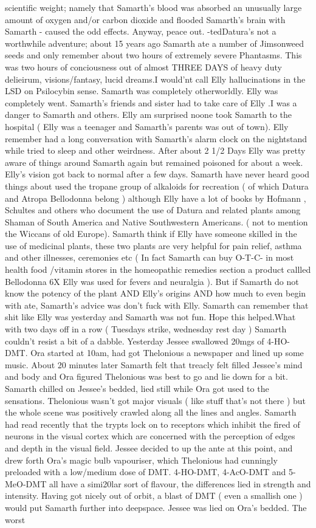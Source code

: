 \documentclass[12pt]{book}
\begin{document}
scientific weight; namely that Samarth's blood was absorbed an unusually large amount of oxygen and/or carbon dioxide and flooded Samarth's brain with Samarth - caused the odd effects. Anyway, peace out. -tedDatura's not a worthwhile adventure; about 15 years ago Samarth ate a number of Jimsonweed seeds and only remember about two hours of extremely severe Phantasms. This was two hours of conciousness out of almost THREE DAYS of heavy duty delieirum, visions/fantasy, lucid dreams.I would'nt call Elly hallucinations in the LSD on Psilocybin sense. Samarth was completely otherworldly. Elly was completely went. Samarth's friends and sister had to take care of Elly .I was a danger to Samarth and others. Elly am surprised noone took Samarth to the hospital (  Elly was a teenager and Samarth's parents was out of town). Elly remember had a long conversation with Samarth's alarm clock on the nightstand while tried to sleep and other weirdness. After about 2 1/2 Days Elly was pretty aware of things around Samarth again but remained poisoned for about a week. Elly's vision got back to normal after a few days. Samarth have never heard good things about used the tropane group of alkaloids for recreation ( of which Datura and Atropa Bellodonna belong ) although Elly have a lot of books by Hofmann , Schultes and others who document the use of Datura and related plants among Shaman of South America and Native Southwestern Americans. ( not to mention the Wiccans of old Europe). Samarth think if Elly have someone skilled in the use of medicinal plants, these two plants are very helpful for pain relief, asthma and other illnesses, ceremonies etc ( In fact Samarth can buy O-T-C- in most health food /vitamin stores in the homeopathic remedies section a product callled Bellodonna 6X Elly was used for fevers and neuralgia ). But if Samarth do not know the potency of the plant AND Elly's origins AND how much to even begin with ate, Samarth's advice was don't fuck with Elly. Samarth can remember that shit like Elly was yesterday and Samarth was not fun. Hope this helped.What with two days off in a row ( Tuesdays strike, wednesday rest day ) Samarth couldn't resist a bit of a dabble. Yesterday Jessee swallowed 20mgs of 4-HO-DMT. Ora started at 10am, had got Thelonious a newspaper and lined up some music. About 20 minutes later Samarth felt that treacly felt filled Jessee's mind and body and Ora figured Thelonious was best to go and lie down for a bit. Samarth chilled on Jessee's bedded, lied still while Ora got used to the sensations. Thelonious wasn't got major visuals ( like stuff that's not there ) but the whole scene was positively crawled along all the lines and angles. Samarth had read recently that the trypts lock on to receptors which inhibit the fired of neurons in the visual cortex which are concerned with the perception of edges and depth in the visual field. Jessee decided to up the ante at this point, and drew forth Ora's magic bulb vapouriser, which Thelonious had cunningly preloaded with a low/medium dose of DMT. 4-HO-DMT, 4-AcO-DMT and 5-MeO-DMT all have a simi20lar sort of flavour, the differences lied in strength and intensity. Having got nicely out of orbit, a blast of DMT ( even a smallish one ) would put Samarth further into deepspace. Jessee was lied on Ora's bedded. The worst 
\end{document}

